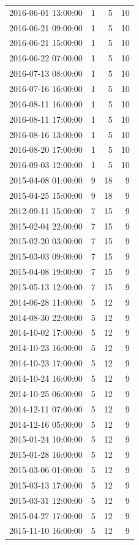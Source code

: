 \begin{tabular}{lrrr}
2016-06-01 13:00:00 & 1 & 5 & 10 \\
2016-06-21 09:00:00 & 1 & 5 & 10 \\
2016-06-21 15:00:00 & 1 & 5 & 10 \\
2016-06-22 07:00:00 & 1 & 5 & 10 \\
2016-07-13 08:00:00 & 1 & 5 & 10 \\
2016-07-16 16:00:00 & 1 & 5 & 10 \\
2016-08-11 16:00:00 & 1 & 5 & 10 \\
2016-08-11 17:00:00 & 1 & 5 & 10 \\
2016-08-16 13:00:00 & 1 & 5 & 10 \\
2016-08-20 17:00:00 & 1 & 5 & 10 \\
2016-09-03 12:00:00 & 1 & 5 & 10 \\
2015-04-08 01:00:00 & 9 & 18 & 9 \\
2015-04-25 15:00:00 & 9 & 18 & 9 \\
2012-09-11 15:00:00 & 7 & 15 & 9 \\
2015-02-04 22:00:00 & 7 & 15 & 9 \\
2015-02-20 03:00:00 & 7 & 15 & 9 \\
2015-03-03 09:00:00 & 7 & 15 & 9 \\
2015-04-08 19:00:00 & 7 & 15 & 9 \\
2015-05-13 12:00:00 & 7 & 15 & 9 \\
2014-06-28 11:00:00 & 5 & 12 & 9 \\
2014-08-30 22:00:00 & 5 & 12 & 9 \\
2014-10-02 17:00:00 & 5 & 12 & 9 \\
2014-10-23 16:00:00 & 5 & 12 & 9 \\
2014-10-23 17:00:00 & 5 & 12 & 9 \\
2014-10-24 16:00:00 & 5 & 12 & 9 \\
2014-10-25 06:00:00 & 5 & 12 & 9 \\
2014-12-11 07:00:00 & 5 & 12 & 9 \\
2014-12-16 05:00:00 & 5 & 12 & 9 \\
2015-01-24 10:00:00 & 5 & 12 & 9 \\
2015-01-28 16:00:00 & 5 & 12 & 9 \\
2015-03-06 01:00:00 & 5 & 12 & 9 \\
2015-03-13 17:00:00 & 5 & 12 & 9 \\
2015-03-31 12:00:00 & 5 & 12 & 9 \\
2015-04-27 17:00:00 & 5 & 12 & 9 \\
2015-11-10 16:00:00 & 5 & 12 & 9 \\

\end{tabular}
